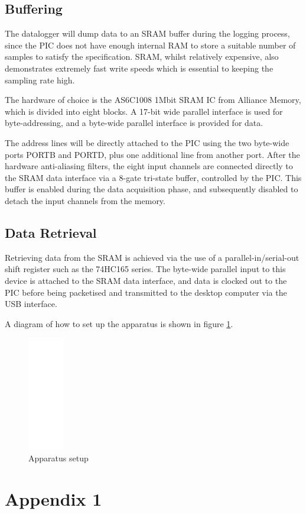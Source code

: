 \documentclass[11pt]{article}
\begin{document}
\subsection{Buffering}
    The datalogger will dump data to an SRAM buffer during the logging process,
    since the PIC does not have enough internal RAM to store a suitable number
    of samples to satisfy the specification. SRAM, whilst relatively expensive,
    also demonstrates extremely fast write speeds which is essential to keeping
    the sampling rate high.

    The hardware of choice is the AS6C1008 1Mbit SRAM IC from Alliance Memory, 
    which is divided into eight blocks. A 17-bit wide parallel interface is 
    used for byte-addressing, and a byte-wide parallel interface is provided 
    for data.

    The address lines will be directly attached to the PIC using the two
    byte-wide ports PORTB and PORTD, plus one additional line from another port.
    After the hardware anti-aliasing filters, the eight input channels are
    connected directly to the SRAM data interface via a 8-gate tri-state 
    buffer, controlled by the PIC. This buffer is enabled during the data
    acquisition phase, and subsequently disabled to detach the input channels
    from the memory.

\subsection{Data Retrieval}
    Retrieving data from the SRAM is achieved via the use of a
    parallel-in/serial-out shift register such as the 74HC165 series. The
    byte-wide parallel input to this device is attached to the SRAM data
    interface, and data is clocked out to the PIC before being packetised and
    transmitted to the desktop computer via the USB interface.

    A diagram of how to set up the apparatus is shown in figure \ref{fig:app}.
    
    \begin{figure}
    \centering
    \includegraphics[height=5cm]{blank}
    \caption{Apparatus setup}
    \label{fig:app}
    \end{figure}
	
\appendix
\appendixpage
\addappheadtotoc
\section{Appendix 1}
			
\end{document}
